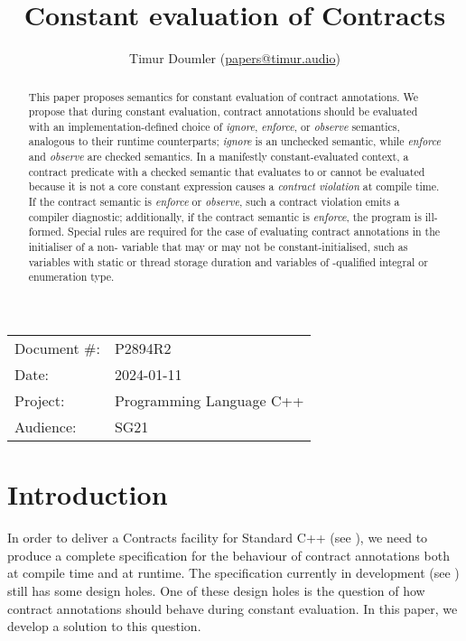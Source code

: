 


\title{Constant evaluation of Contracts}
\author{ Timur Doumler \small(\href{mailto:papers@timur.audio}{papers@timur.audio})}
\date{}
\maketitle

\begin{tabular}{ll}
Document \#: & P2894R2 \\
Date: &2024-01-11 \\
Project: & Programming Language C++ \\
Audience: & SG21
\end{tabular}

\begin{abstract}
This paper proposes semantics for constant evaluation of contract annotations. We propose that during constant evaluation, contract annotations should be evaluated with an implementation-defined choice of \emph{ignore}, \emph{enforce}, or \emph{observe} semantics, analogous to their runtime counterparts; \emph{ignore} is an unchecked semantic, while \emph{enforce} and \emph{observe} are checked semantics. In a manifestly constant-evaluated context, a contract predicate with a checked semantic that evaluates to  or cannot be evaluated because it is not a core constant expression causes a \emph{contract violation} at compile time. If the contract semantic is \emph{enforce} or \emph{observe}, such a contract violation emits a compiler diagnostic; additionally, if the contract semantic is \emph{enforce}, the program is ill-formed. Special rules are required for the case of evaluating contract annotations in the initialiser of a non- variable that may or may not be constant-initialised, such as variables with static or thread storage duration and variables of -qualified integral or enumeration type.
\end{abstract}

\section{Introduction}
\label{sec:intro}

In order to deliver a Contracts facility for Standard C++ (see \cite{P2695R1}), we need to produce a complete specification for the behaviour of contract annotations both at compile time and at runtime. The specification currently in development (see \cite{P2900R3}) still has some design holes. One of these design holes is the question of how contract annotations should behave during constant evaluation. In this paper, we develop a solution to this question.

